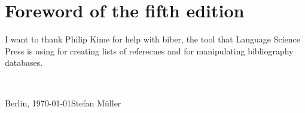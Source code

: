 
\section*{Foreword of the fifth edition}

I want to thank Philip Kime for help with biber, the tool that Language Science Press is using for
creating lists of referecnes and for manipulating bibliography databases.


~\medskip

\noindent
Berlin, \today\hfill Stefan Müller



